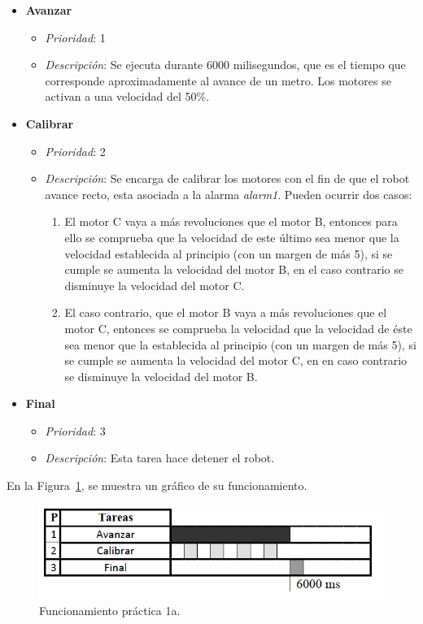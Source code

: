 \begin{itemize}
	\item \textbf{Avanzar}
		\begin{itemize}
			\item \textit{Prioridad}: 1
			\item \textit{Descripción}: Se ejecuta durante 6000 milisegundos, que es el tiempo que corresponde aproximadamente al avance de un metro. Los motores se activan a una velocidad del 50\%.
		\end{itemize}
	
	\item \textbf{Calibrar}
		\begin{itemize}
			\item \textit{Prioridad}: 2
			\item \textit{Descripción}: Se encarga de calibrar los motores con el fin de que el robot avance recto, esta asociada a la alarma \textit{alarm1}. Pueden ocurrir dos casos:
			\begin{enumerate}
				\item El motor C vaya a más revoluciones que el motor B, entonces para ello se comprueba que la velocidad de este último sea menor que la velocidad establecida al principio (con un margen de más 5), si se cumple se aumenta la velocidad del motor B, en el caso contrario se disminuye la velocidad del motor C.
				\item El caso contrario, que el motor B vaya a más revoluciones que el motor C, entonces se comprueba la velocidad que la velocidad de éste sea menor que la establecida al principio (con un margen de más 5), si se cumple se aumenta la velocidad del motor C, en en caso contrario se disminuye la velocidad del motor B.
			\end{enumerate}
		\end{itemize}
	
	\item \textbf{Final}
		\begin{itemize}
			\item \textit{Prioridad}: 3
			\item \textit{Descripción}: Esta tarea hace detener el robot.
		\end{itemize}
\end{itemize}


En la Figura~\ref{grafico1a}, se muestra un gráfico de su funcionamiento.

\begin{figure}[H]
 \centering
 \includegraphics[scale=0.4]{./img/grafico1a.png}
 \caption{Funcionamiento práctica 1a.}
 \label{grafico1a}
\end{figure}

